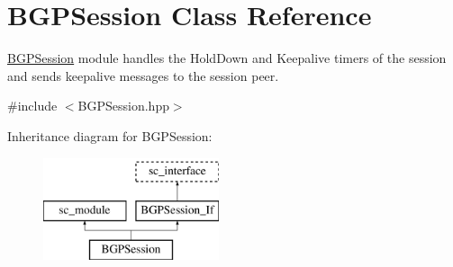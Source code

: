 \hypertarget{classBGPSession}{\section{B\-G\-P\-Session Class Reference}
\label{classBGPSession}
}


\hyperlink{classBGPSession}{B\-G\-P\-Session} module handles the Hold\-Down and Keepalive timers of the session and sends keepalive messages to the session peer.  




{\ttfamily \#include $<$B\-G\-P\-Session.\-hpp$>$}

Inheritance diagram for B\-G\-P\-Session\-:\begin{figure}[H]
\begin{center}
\leavevmode
\includegraphics[height=3.000000cm]{classBGPSession}
\end{center}
\end{figure}
